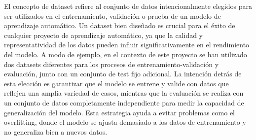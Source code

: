El concepto de dataset refiere al conjunto de datos intencionalmente elegidos para ser utilizados en el entrenamiento, validación o prueba de un modelo de aprendizaje automático. Un dataset bien diseñado es crucial para el éxito de cualquier proyecto de aprendizaje automático, ya que la calidad y representatividad de los datos pueden influir significativamente en el rendimiento del modelo.
A modo de ejemplo, en el contexto de este proyecto se han utilizado dos datasets diferentes para los procesos de entrenamiento-validación y evaluación, junto con un conjunto de test fijo adicional. La intención detrás de esta elección es garantizar que el modelo se entrene y valide con datos que reflejen una amplia variedad de casos, mientras que la evaluación se realiza con un conjunto de datos completamente independiente para medir la capacidad de generalización del modelo. Esta estrategia ayuda a evitar problemas como el overfitting, donde el modelo se ajusta demasiado a los datos de entrenamiento y no generaliza bien a nuevos datos.